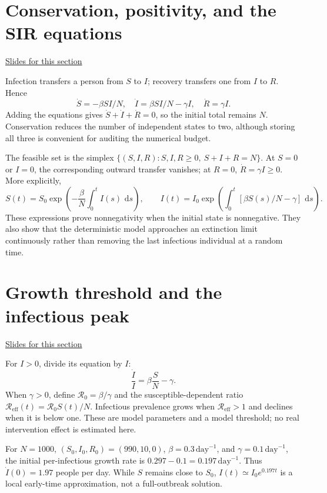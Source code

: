 \documentclass[11pt,letterpaper]{article}
\providecommand{\dd}{\,\mathrm{d}}\providecommand{\R}{\mathbb{R}}
\theoremstyle{definition}\newtheorem{definition}{Definition}\newtheorem{example}{Example}
\numberwithin{equation}{section}
\begin{document}
\section{Conservation, positivity, and the SIR equations}
\hypertarget{note-conservation-positivity-and-the-sir-equations}{}\label{note:conservation-positivity-and-the-sir-equations}
{\small \href{slides.html\#frame=derivation-of-the-sir-equations\&step=1}{Slides for this section}}\par
Infection transfers a person from $S$ to $I$; recovery transfers one from $I$ to $R$. Hence
\[
\boxed{\dot S=-\beta SI/N,\quad
\dot I=\beta SI/N-\gamma I,\quad
\dot R=\gamma I.}
\]
Adding the equations gives $\dot S+\dot I+\dot R=0$, so the initial total remains $N$. Conservation reduces the number of independent states to two, although storing all three is convenient for auditing the numerical budget.

The feasible set is the simplex $\{(S,I,R):S,I,R\geq0,\ S+I+R=N\}$. At $S=0$ or $I=0$, the corresponding outward transfer vanishes; at $R=0$, $\dot R=\gamma I\geq0$. More explicitly,
\[
S(t)=S_0\exp\!\left(-\frac\beta N\int_0^t I(s)\,\dd s\right),\qquad
I(t)=I_0\exp\!\left(\int_0^t[\beta S(s)/N-\gamma]\,\dd s\right).
\]
These expressions prove nonnegativity when the initial state is nonnegative. They also show that the deterministic model approaches an extinction limit continuously rather than removing the last infectious individual at a random time.
\section{Growth threshold and the infectious peak}
\hypertarget{note-growth-threshold-and-the-infectious-peak}{}\label{note:growth-threshold-and-the-infectious-peak}
{\small \href{slides.html\#frame=per-infectious-growth-rate\&step=1}{Slides for this section}}\par
For $I>0$, divide its equation by $I$:
\[
\frac{\dot I}{I}=\beta\frac SN-\gamma.
\]
When $\gamma>0$, define $\mathcal R_0=\beta/\gamma$ and the susceptible-dependent ratio $\mathcal R_{\mathrm{eff}}(t)=\mathcal R_0 S(t)/N$. Infectious prevalence grows when $\mathcal R_{\mathrm{eff}}>1$ and declines when it is below one. These are model parameters and a model threshold; no real intervention effect is estimated here.

For $N=1000$, $(S_0,I_0,R_0)=(990,10,0)$, $\beta=0.3\,\mathrm{day}^{-1}$, and $\gamma=0.1\,\mathrm{day}^{-1}$, the initial per-infectious growth rate is $0.297-0.1=0.197\,\mathrm{day}^{-1}$. Thus $\dot I(0)=1.97$ people per day. While $S$ remains close to $S_0$, $I(t)\simeq I_0e^{0.197t}$ is a local early-time approximation, not a full-outbreak solution.
\end{document}
